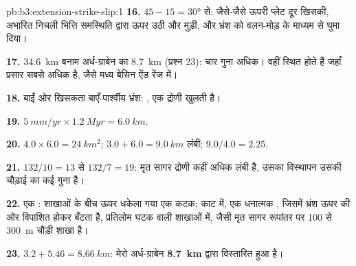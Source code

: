 \begin{solution}{pb:b3:extension-strike-slip:1}
\textbf{16.} $45 - 15 = \ang{30}$ से: जैसे-जैसे ऊपरी प्लेट दूर खिसकी,
अभारित निचली भित्ति समस्थिति द्वारा ऊपर उठी और मुड़ी, और भ्रंश को
वलन-मोड़ के माध्यम से घुमा दिया।

\textbf{17.} \qty{34.6}{km} बनाम अर्ध-ग्राबेन का \qty{8.7}{km} (प्रश्न
23): चार गुना अधिक।  वहीं स्थित होते हैं जहाँ प्रसार
सबसे अधिक है, जैसे मध्य बेसिन ऐंड रेंज में।

\textbf{18.} बाईं ओर खिसकता बाएँ-पार्श्वीय भ्रंश: , एक द्रोणी खुलती है।

\textbf{19.} $\qty{5}{mm/yr}\times\qty{1.2}{Myr} = \qty{6.0}{km}$.

\textbf{20.} $4.0\times6.0 = \qty{24}{km^2}$; $3.0 + 6.0 = \qty{9.0}{km}$ लंबी;
$9.0/4.0 = 2.25$.

\textbf{21.} $132/10 = 13$ से $132/7 = 19$: मृत सागर द्रोणी कहीं अधिक
लंबी है, उसका विस्थापन उसकी चौड़ाई का कई गुना है।

\textbf{22.} एक : शाखाओं के बीच ऊपर धकेला गया एक कटक; काट में,
एक धनात्मक , जिसमें भ्रंश ऊपर की ओर विपाशित होकर बँटता है,
प्रतिलोम घटक वाली शाखाओं में, जैसी मृत सागर
रूपांतर पर 100 से \qty{300}{m} चौड़ी शाखा है।

\textbf{23.} $3.2 + 5.46 = \qty{8.66}{km}$: मेरो अर्ध-ग्राबेन
\textbf{\qty[text-series-to-math=true]{8.7}{km}} द्वारा विस्तारित हुआ है।
\end{solution}
